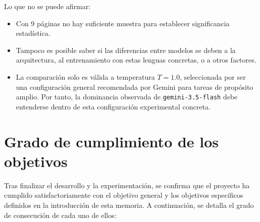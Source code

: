 Lo que no se puede afirmar:

\begin{itemize}
    \item Con 9 páginas no hay suficiente muestra para establecer significancia estadística.

    \item Tampoco es posible saber si las diferencias entre modelos se deben a la arquitectura, al entrenamiento con estas lenguas concretas, o a otros factores.

        \item La comparación solo es válida a temperatura \(T=1.0\), seleccionada por ser una configuración general recomendada por Gemini para tareas de propósito amplio. Por tanto, la dominancia observada de \texttt{gemini-3.5-flash} debe entenderse dentro de esta configuración experimental concreta.
\end{itemize}




\section{Grado de cumplimiento de los objetivos}

Tras finalizar el desarrollo y la experimentación, se confirma que el proyecto ha cumplido satisfactoriamente con el objetivo general y los objetivos específicos definidos en la introducción de esta memoria. A continuación, se detalla el grado de consecución de cada uno de ellos:


